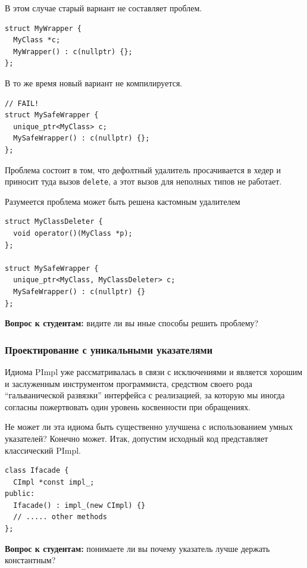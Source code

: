 \documentclass[a4paper,12pt,oneside]{article}
\newif\ifanswers
\begin{document}
В этом случае старый вариант не составляет проблем.

\begin{lstlisting}
struct MyWrapper {
  MyClass *c;
  MyWrapper() : c(nullptr) {};
};
\end{lstlisting}

В то же время новый вариант не компилируется.

\begin{lstlisting}
// FAIL!
struct MySafeWrapper {
  unique_ptr<MyClass> c; 
  MySafeWrapper() : c(nullptr) {};
};
\end{lstlisting}

Проблема состоит в том, что дефолтный удалитель просачивается в хедер и приносит туда вызов \lstinline!delete!, а этот вызов для неполных типов не работает.

Разумеется проблема может быть решена кастомным удалителем

\begin{lstlisting}
struct MyClassDeleter {
  void operator()(MyClass *p);
};

struct MySafeWrapper { 
  unique_ptr<MyClass, MyClassDeleter> c; 
  MySafeWrapper() : c(nullptr) {}
};
\end{lstlisting}

\textbf{Вопрос к студентам:} видите ли вы иные способы решить проблему?
\ifanswers
Правильный ответ: да, например не определять конструктор в хедере.
\fi

\subsubsection{Проектирование с уникальными указателями}\label{subsub:uniquetrees}

Идиома PImpl уже рассматривалась в связи с исключениями и является хорошим и заслуженным инструментом программиста, средством своего рода ``гальванической развязки'' интерфейса с реализацией, за которую мы иногда согласны пожертвовать один уровень косвенности при обращениях.

Не может ли эта идиома быть существенно улучшена с использованием умных указателей? Конечно может. Итак, допустим исходный код представляет классический PImpl.

\begin{lstlisting}
class Ifacade {
  CImpl *const impl_;
public:
  Ifacade() : impl_(new CImpl) {}  
  // ..... other methods
};
\end{lstlisting}

\textbf{Вопрос к студентам:} понимаете ли вы почему указатель лучше держать константным?
\end{document}
